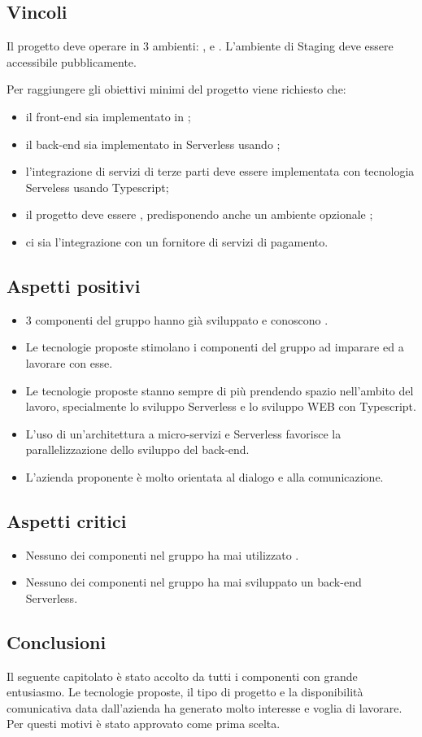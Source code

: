 \subsection{Vincoli}
Il progetto deve operare in 3 ambienti: ,  e .
L'ambiente di Staging deve essere accessibile pubblicamente.

Per raggiungere gli obiettivi minimi del progetto viene richiesto che:
\begin{itemize}
	\item il front-end sia implementato in ;
	\item il back-end sia implementato in Serverless usando ;
	\item l'integrazione di servizi di terze parti deve essere implementata con tecnologia Serveless usando Typescript;
	\item il progetto deve essere , predisponendo anche un ambiente opzionale ;
	\item ci sia l'integrazione con un fornitore di servizi di pagamento.
\end{itemize}

\subsection{Aspetti positivi}
\begin{itemize}
	\item 3 componenti del gruppo hanno già sviluppato e conoscono .
	\item Le tecnologie proposte stimolano i componenti del gruppo ad imparare ed a lavorare con esse.
	\item Le tecnologie proposte stanno sempre di più prendendo spazio nell'ambito del lavoro, specialmente lo sviluppo Serverless e lo sviluppo WEB con Typescript.
	\item L'uso di un'architettura a micro-servizi e Serverless favorisce la parallelizzazione dello sviluppo del back-end.
	\item L'azienda proponente è molto orientata al dialogo e alla comunicazione.
\end{itemize}

\subsection{Aspetti critici}
\begin{itemize}
	\item Nessuno dei componenti nel gruppo ha mai utilizzato .
	\item Nessuno dei componenti nel gruppo ha mai sviluppato un back-end Serverless.
\end{itemize}

\subsection{Conclusioni}
Il seguente capitolato è stato accolto da tutti i componenti con grande entusiasmo. Le tecnologie proposte, il tipo di progetto e la disponibilità comunicativa data dall'azienda ha generato molto interesse e voglia di lavorare. Per questi motivi è stato approvato come prima scelta.